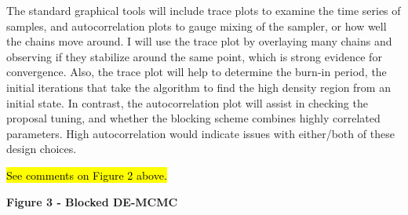 \documentclass[12pt]{article}
\newcommand{\trish}[1]{\textrm{\hl{#1}}}
\begin{document}
The standard graphical tools will include trace plots to examine the
time series of samples, and autocorrelation plots to gauge mixing of
the sampler, or how well the chains move around. I will use the trace
plot by overlaying many chains and observing if they stabilize around
the same point, which is strong evidence for convergence. Also, the
trace plot will help to determine the burn-in period, the initial
iterations that take the algorithm to find the high density region
from an initial state. In contrast, the autocorrelation plot will
assist in checking the proposal tuning, and whether the blocking
scheme combines highly correlated parameters. High autocorrelation
would indicate issues with either/both of these design choices.


\trish{See comments on Figure 2 above.}
\trish{\label{fig:de-mcmc-blocked}}

\centerline{\textbf{Figure 3 - Blocked DE-MCMC}}

	
\end{document}
